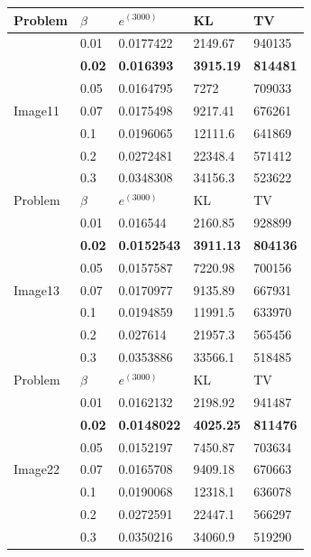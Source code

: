 \begin{table}[H]
\begin{center}
\renewcommand*{\arraystretch}{1.6}
\begin{tabular}{|C{1.8cm}|C{1cm}|C{2.2cm}|C{2.2cm}|C{2.2cm}|}
\hline
Problem & $\beta$ & $e^{(3000)}$ & KL & TV \\ \hline
 & 0.01 & 0.0177422 & 2149.67 & 940135 \\ 
 & \textbf{0.02} & \textbf{0.016393} & \textbf{3915.19} & \textbf{814481} \\ 
 & 0.05 & 0.0164795 & 7272 & 709033 \\ 
Image11 & 0.07 & 0.0175498 & 9217.41 & 676261 \\ 
 & 0.1 & 0.0196065 &  12111.6 & 641869 \\ 
 & 0.2 & 0.0272481 & 22348.4 & 571412\\ 
 & 0.3 & 0.0348308 & 34156.3 & 523622\\
\hline
Problem & $\beta$ & $e^{(3000)}$ & KL & TV \\ \hline
 & 0.01 & 0.016544 & 2160.85 & 928899\\ 
 & \textbf{0.02} & \textbf{0.0152543} & \textbf{3911.13} & \textbf{804136} \\ 
 & 0.05 & 0.0157587 & 7220.98 & 700156\\ 
Image13 & 0.07 & 0.0170977 & 9135.89 & 667931\\ 
 & 0.1 & 0.0194859 & 11991.5 & 633970\\ 
 & 0.2 & 0.027614 & 21957.3 & 565456\\ 
 & 0.3 & 0.0353886 & 33566.1 & 518485\\
\hline
Problem & $\beta$ & $e^{(3000)}$ & KL & TV \\ \hline
 & 0.01 & 0.0162132 & 2198.92 & 941487\\ 
 & \textbf{0.02} & \textbf{0.0148022} & \textbf{4025.25} & \textbf{811476} \\ 
 & 0.05 & 0.0152197  & 7450.87 & 703634\\ 
Image22 & 0.07 & 0.0165708 & 9409.18 & 670663\\ 
 & 0.1 & 0.0190068 & 12318.1 & 636078\\ 
 & 0.2 & 0.0272591 & 22447.1 & 566297\\ 
 & 0.3 & 0.0350216 & 34060.9 & 519290\\ 
\hline
\end{tabular}
\end{center}
\end{table}

